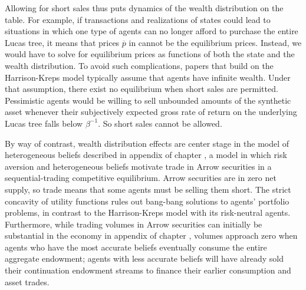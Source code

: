 Allowing for 
short sales thus  puts  dynamics of the wealth 
distribution on the table. For example, if 
transactions and  realizations of states could lead 
to situations in which one type of agents can no longer 
afford to purchase the entire Lucas tree, it 
means that prices $\overline p$ in  cannot
be the equilibrium prices. Instead, we would have to 
solve for equilibrium prices as functions of both the 
state and the wealth distribution. To avoid 
such complications,  papers  that build on the
Harrison-Kreps model  typically assume that agents
have infinite wealth. Under that assumption,   there 
 exist no equilibrium when  short sales are permitted. Pessimistic agents 
would be willing to sell unbounded amounts of the 
synthetic asset whenever their subjectively expected 
gross rate of return on the underlying Lucas 
tree falls below $\beta^{-1}$. So short sales cannot be allowed.
%
%



By way of contrast, wealth distribution  effects 
are center stage in the model of  heterogeneous beliefs 
described in appendix  of chapter , a model in which    risk aversion and  heterogeneous beliefs 
motivate trade in Arrow securities in a 
sequential-trading competitive equilibrium.
Arrow securities are in zero net supply, so 
 trade  means that some agents must be selling them short. 
 The strict concavity of 
utility functions rules out  bang-bang solutions
to agents' portfolio problems, in contrast to the 
Harrison-Kreps model with its  risk-neutral agents. Furthermore, while trading 
volumes in Arrow securities can initially be substantial 
in the economy in appendix  of 
chapter ,  volumes 
approach zero when agents who have  the most
accurate beliefs eventually  consume the entire
aggregate endowment; agents with less 
accurate beliefs will  have already sold their  continuation endowment streams to finance their earlier consumption 
and asset trades.




